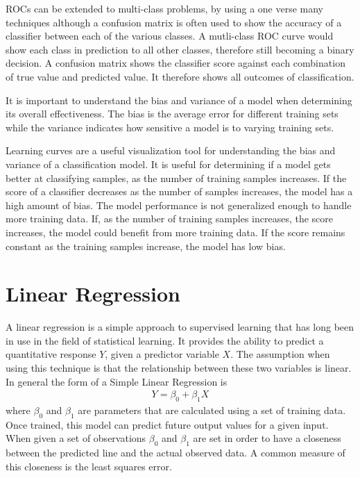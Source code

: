 ROCs can be extended to multi-class problems, by using a one verse many techniques although a confusion matrix is often used to show the accuracy of a classifier between each of the various classes.  A mutli-class ROC curve would show each class in prediction to all other classes, therefore still becoming a binary decision.  A confusion matrix shows the classifier score against each combination of true value and predicted value.  It therefore shows all outcomes of classification.

It is important to understand the bias and variance of a model when determining its overall effectiveness.  The bias is the average error for different training sets while the variance indicates how sensitive a model is to varying training sets.

Learning curves are a useful visualization tool for understanding the bias and variance of a classification model.  It is useful for determining if a model gets better at classifying samples, as the number of training samples increases.  If the score of a classifier decreases as the number of samples increases, the model has a high amount of bias.  The model performance is not generalized enough to handle more training data.  If, as the number of training samples increases, the score increases, the model could benefit from more training data.  If the score remains constant as the training samples increase, the model has low bias.

\section{Linear Regression}
A linear regression is a simple approach to supervised learning that has long been in use in the field of statistical learning.  It provides the ability to predict a quantitative response $Y$, given a predictor variable $X$.  The assumption when using this technique is that the relationship between these two variables is linear.  In general the form of a Simple Linear Regression is
%
\begin{align}
    Y = \beta_0 + \beta_1 X
\end{align}
%
where $\beta_0$ and $\beta_1$ are parameters that are calculated using a set of training data.  Once trained, this model can predict future output values for a given input.  When given a set of observations $\beta_0$ and $\beta_1$ are set in order to have a closeness between the predicted line and the actual observed data.  A common measure of this closeness is the least squares error.

